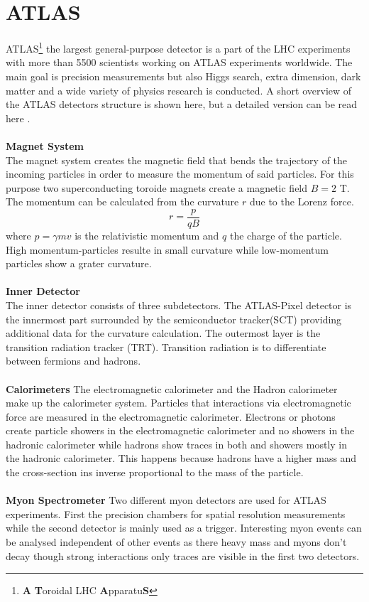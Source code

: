 \documentclass[../Bachelorarbeit.tex]{subfiles}
\begin{document}
\section{ATLAS}
ATLAS\footnote{\textbf{A} \textbf{T}oroidal LHC \textbf{A}pparatu\textbf{S}} the largest general-purpose detector is a part of the LHC experiments with more than 5500 scientists working on
ATLAS experiments worldwide. The main goal is precision measurements but also Higgs search, extra dimension, dark matter and a wide variety of physics research is conducted.
A short overview of the ATLAS detectors structure is shown here, but a detailed version can be read here \cite{Evans.2008}.
\\\\
\textbf{Magnet System}\\
The magnet system creates the magnetic field that bends the trajectory of the incoming particles in order to measure the momentum of said particles.
For this purpose two superconducting toroide magnets create a magnetic field $B=2$ T. The momentum can be calculated from the curvature $r$ due to the Lorenz force.
\begin{equation}
    r=\frac{p}{q B}
\end{equation}
where $p=\gamma m v$ is the relativistic momentum and $q$ the charge of the particle. High momentum-particles resulte in small curvature while low-momentum particles show a grater curvature.
\\\\
\textbf{Inner Detector}\\
The inner detector consists of three subdetectors. The ATLAS-Pixel detector is the innermost part surrounded by the semiconductor tracker(SCT) providing additional data for the curvature calculation.
The outermost layer is the transition radiation tracker (TRT). Transition radiation is to differentiate between fermions and hadrons.
\\\\
\textbf{Calorimeters}
The electromagnetic calorimeter and the Hadron calorimeter make up the calorimeter system. Particles that interactions via electromagnetic force are measured in
the electromagnetic calorimeter. Electrons or photons create particle showers in the electromagnetic calorimeter and no showers in the hadronic calorimeter while hadrons show traces in both and showers mostly in the hadronic calorimeter.
This happens because hadrons have a higher mass and the cross-section ins inverse proportional to the mass of the particle.
\\\\
\textbf{Myon Spectrometer}
Two different myon detectors are used for ATLAS experiments. First the precision chambers for spatial resolution measurements while the second detector is mainly used as a trigger. Interesting myon events can be analysed
independent of other events as there heavy mass and myons don't decay though strong interactions only traces are visible in the first two detectors.
\end{document}
